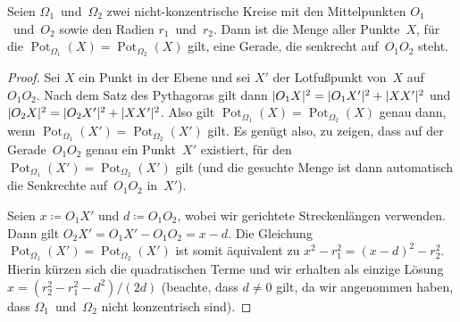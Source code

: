\begin{satzmitnamen}
	Seien $\Omega_1$~und~$\Omega_2$ zwei nicht-konzentrische Kreise mit den  Mittelpunkten $O_1$~und~$O_2$ sowie den Radien $r_1$~und~$r_2$. Dann ist die Menge aller Punkte~$X$, für die $\operatorname{Pot}_{\Omega_1}(X)=\operatorname{Pot}_{\Omega_2}(X)$ gilt, eine Gerade, die senkrecht auf~$O_1O_2$ steht.
\end{satzmitnamen}

\begin{proof}
	Sei $X$ ein Punkt in der Ebene und sei $X'$ der Lotfußpunkt von~$X$ auf~$O_1O_2$. Nach dem Satz des Pythagoras gilt dann $\lvert O_1X\rvert^2=\lvert O_1X'\rvert^2+\lvert XX'\rvert^2$ und $\lvert O_2X\rvert^2=\lvert O_2X'\rvert^2+\lvert XX'\rvert^2$. Also gilt $\operatorname{Pot}_{\Omega_1}(X)=\operatorname{Pot}_{\Omega_2}(X)$ genau dann, wenn $\operatorname{Pot}_{\Omega_1}(X')=\operatorname{Pot}_{\Omega_2}(X')$ gilt. Es genügt also, zu zeigen, dass auf der Gerade~$O_1O_2$ genau ein Punkt~$X'$ existiert, für den $\operatorname{Pot}_{\Omega_1}(X')=\operatorname{Pot}_{\Omega_2}(X')$ gilt (und die gesuchte Menge ist dann automatisch die Senkrechte auf~$O_1O_2$ in~$X'$).
	
	Seien $x\coloneqq O_1X'$ und $d\coloneqq O_1O_2$, wobei wir gerichtete Streckenlängen verwenden. Dann gilt $O_2X'=O_1X'-O_1O_2=x-d$. Die Gleichung $\operatorname{Pot}_{\Omega_1}(X')=\operatorname{Pot}_{\Omega_2}(X')$ ist somit äquivalent zu $x^2-r_1^2=(x-d)^2-r_2^2$. Hierin kürzen sich die quadratischen Terme und wir erhalten als einzige Lösung $x={(r_2^2-r_1^2-d^2)}/{(2d)}$ (beachte, dass $d\neq 0$ gilt, da wir angenommen haben, dass $\Omega_1$~und~$\Omega_2$ nicht konzentrisch sind).
\end{proof}

